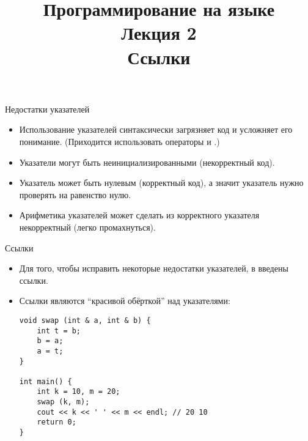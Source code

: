 \documentclass{beamer}
\title{{\bf Программирование на языке \langcpp\protect\\Лекция
2\protect\vspace{1em}\\}Ссылки}
\begin{document}
\begin{frame} 
  \titlepage
\end{frame}

\begin{frame}[fragile]{Недостатки указателей}
    \begin{itemize}
        \item Использование указателей синтаксически загрязняет код
            и усложняет его понимание.
            (Приходится использовать операторы \code{*} и \code{\&}.)

        \item Указатели могут быть неинициализированными (некорректный код).

        \item Указатель может быть нулевым (корректный код), 
            а значит указатель нужно проверять на равенство нулю.

        \item Арифметика указателей может сделать из корректного указателя
            некорректный (легко промахнуться).
    \end{itemize}
\end{frame}

\begin{frame}[fragile]{Ссылки}
    \begin{itemize}
        \item Для того, чтобы исправить некоторые недостатки указателей,
            в \langcpp введены ссылки.

        \item Ссылки являются ``красивой обёрткой'' над указателями:
\begin{lstlisting}
void swap (int & a, int & b) {
    int t = b;
    b = a;
    a = t;
}

int main() {
    int k = 10, m = 20;
    swap (k, m);
    cout << k << ' ' << m << endl; // 20 10
    return 0;
}
\end{lstlisting}
    \end{itemize}
\end{frame}
\end{document}

